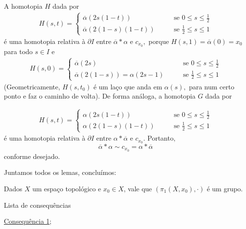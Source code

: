 \begin{dem}
    A homotopia $H$ dada por 
    \begin{align*}
        H(s,t)=\begin{cases}
            \overline{\alpha}(2s(1-t))\;\;\;&\;\;\;\mbox{ se }0\le s \le \frac{1}{2}\\
            \overline{\alpha}(2(1-s)(1-t)) \;\;\;&\;\;\;\mbox{ se }\frac{1}{2}\le s\le 1 
        \end{cases}
    \end{align*}
    é uma homotopia relativa à $\partial I$ entre $\overline{\alpha}*\alpha$ e $c_{x_0},$ porque $H(s,1)=\overline{\alpha}(0)=x_0$ para todo $s\in I$ e 
    \begin{align*}
        H(s,0)=\begin{cases}
            \overline{\alpha}(2s)\;\;\;&\;\;\;\mbox{ se }0\le s \le \frac{1}{2}\\
            \overline{\alpha}(2(1-s))=\alpha(2s-1) \;\;\;&\;\;\;\mbox{ se }\frac{1}{2}\le s\le 1
        \end{cases}
    \end{align*}
    (Geometricamente, $H(s,t_0)$ é um laço que anda em $\alpha(s),$ para num certo ponto e faz o caminho de volta).
    De forma análoga, a homotopia $G$ dada por 
   
\begin{align*}
        H(s,t)=\begin{cases}
            \alpha(2s(1-t))\;\;\;&\;\;\;\mbox{ se }0\le s \le \frac{1}{2} \\
            \alpha(2(1-s)(1-t)) \;\;\;&\;\;\;\mbox{ se }\frac{1}{2}\le s\le 1 
        \end{cases}
    \end{align*}
    é uma homotopia relativa à $\partial I$ entre $\alpha*\overline{\alpha}$ e $c_{x_0}.$ Portanto, $$\overline{\alpha}*\alpha\sim c_{x_0}=\alpha*\overline{\alpha}$$ conforme desejado.
\end{dem}

Juntamos todos os lemas, concluímos: 

\begin{thm}
    Dados $X$ um espaço topológico e $x_0\in X$, vale que $(\pi_1(X,x_0),\cdot)$ é um grupo.
\end{thm}

\begin{titlemize}{Lista de consequências}
	\item \hyperref[grupo-fundamental-def]{Consequência 1};\\ %
\end{titlemize}
